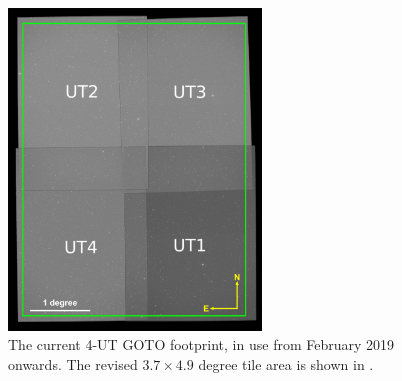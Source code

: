 \begin{colsection}
\begin{colsection}
\begin{figure}[p]
    \begin{center}
        \includegraphics[width=0.6\textwidth]{images/footprint_2_box.png}
    \end{center}
    \caption[The current 4-UT GOTO footprint]{
        The current 4-UT GOTO footprint, in use from February 2019 onwards. The revised $3.7 \times 4.9$ degree tile area is shown in .
    }\label{fig:4ut_footprint}
\end{figure}

\clearpage


\end{colsection}
\end{colsection}
